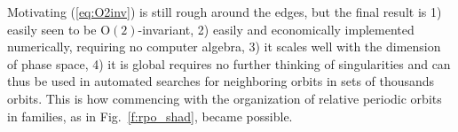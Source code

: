 \documentclass[aip,cha,showpacs,reprint]{revtex4-1} %
\newcommand{\beq}{\begin{equation}}
\newcommand{\eeq}{\end{equation}}
\newcommand{\refeq}  [1] {(\ref{#1})}
\newcommand{\reffig} [1] {Fig.~\ref{#1}}
\newcommand{\ie}{{i.e.}}
\newcommand{\KSe}{Kuramoto-Siva\-shin\-sky equation}
\newcommand{\On}[1]{\ensuremath{\textrm{O}(#1)}}
\begin{document}
Motivating \refeq{eq:O2inv} is still rough around the edges, but the final result is
1) easily seen to be $\On{2}$-invariant, 2) easily and economically
implemented numerically, requiring no computer algebra, 3) it scales well
with the dimension of phase space, 4) it is global requires no further
thinking of singularities and can thus be used in automated searches for
neighboring orbits in sets of thousands orbits. This is how commencing with the
organization of relative periodic orbits in families, as in \reffig{f:rpo_shad},
became possible.

\appendix

%
%
%



\end{document}
